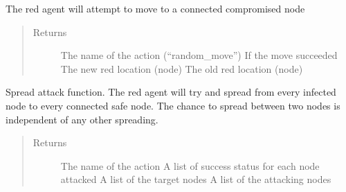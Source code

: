 \documentclass[letterpaper,10pt,english]{sphinxmanual}
\begin{document}
\begin{fulllineitems}
\begin{fulllineitems}
\label{\detokenize{source/yawning_titan.envs.generic.core:yawning_titan.envs.generic.core.red_action_set.RedActionSet.random_move}}
\sphinxAtStartPar
The red agent will attempt to move to a connected compromised node
\begin{quote}\begin{description}
\item[{Returns}] \leavevmode
\sphinxAtStartPar
The name of the action (“random\_move”)
If the move succeeded
The new red location (node)
The old red location (node)

\end{description}\end{quote}

\end{fulllineitems}


\begin{fulllineitems}
\label{\detokenize{source/yawning_titan.envs.generic.core:yawning_titan.envs.generic.core.red_action_set.RedActionSet.spread}}
\sphinxAtStartPar
Spread attack function. The red agent will try and spread from every infected node to every connected safe node.
The chance to spread between two nodes is independent of any other spreading.
\begin{quote}\begin{description}
\item[{Returns}] \leavevmode
\sphinxAtStartPar
The name of the action
A list of success status for each node attacked
A list of the target nodes
A list of the attacking nodes


\end{description}
\end{quote}
\end{fulllineitems}
\end{fulllineitems}
\end{document}
